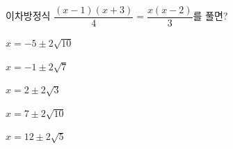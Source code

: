 이차방정식 $\dfrac{(x-1)(x+3)}{4}=\dfrac{x(x-2)}{3}$를 풀면?
\begin{choicesii}{\rule[-3ex]{0pt}{8ex}$x=-5\pm2\sqrt{10}$}{\rule[-3ex]{0pt}{8ex}$x=-1\pm2\sqrt{7}$}{\rule[-3ex]{0pt}{8ex}$x=2\pm2\sqrt{3}$}{\rule[-3ex]{0pt}{8ex}$x=7\pm2\sqrt{10}$}{\rule[-3ex]{0pt}{8ex}$x=12\pm2\sqrt{5}$}\end{choicesii}
